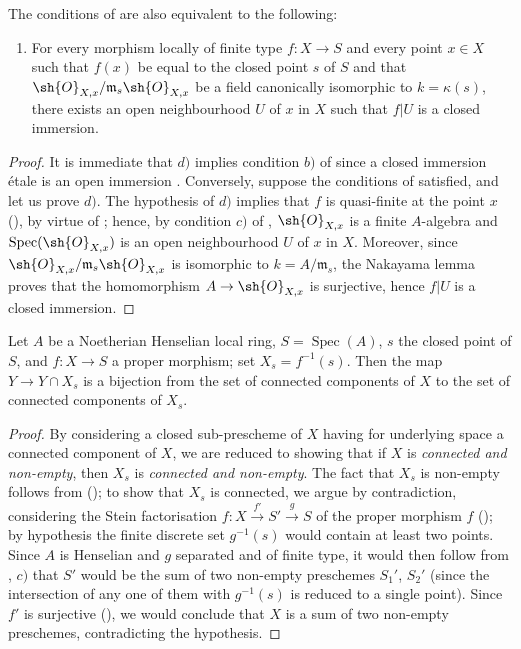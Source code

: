 \begin{remark}[18.5.18]
\label{IV.18.5.18}
The conditions of  are also equivalent to the following:
\begin{enumerate}
  \item[d)] For every morphism locally of finite type $f:X\to S$ and every point $x\in X$ such that $f(x)$ be equal to the closed point $s$ of $S$ and that $\sh{O}_{X,x}/\mathfrak{m}_s\sh{O}_{X,x}$ be a field canonically isomorphic to $k=\kappa(s)$, there exists an open neighbourhood $U$ of $x$ in $X$ such that $f|U$ is a closed immersion.
\end{enumerate}
\end{remark}

\begin{proof}
It is immediate that $d)$ implies condition $b)$ of  since a closed immersion \'etale is an open immersion .
Conversely, suppose the conditions of  satisfied, and let us prove $d)$.
The hypothesis of $d)$ implies that $f$ is quasi-finite at the point $x$ (), by virtue of ;
hence, by condition $c)$ of , $\sh{O}_{X,x}$ is a finite $A$-algebra and $\operatorname{Spec}(\sh{O}_{X,x})$ is an open neighbourhood $U$ of $x$ in $X$.
Moreover, since $\sh{O}_{X,x}/\mathfrak{m}_s\sh{O}_{X,x}$ is isomorphic to $k=A/\mathfrak{m}_s$, the Nakayama lemma proves that the homomorphism $A\to\sh{O}_{X,x}$ is surjective, hence $f|U$ is a closed immersion.
\end{proof}

\begin{proposition}[18.5.19]
\label{IV.18.5.19}
Let $A$ be a Noetherian Henselian local ring, $S=\operatorname{Spec}(A)$, $s$ the closed point of $S$, and $f:X\to S$ a proper morphism;
set $X_s=f^{-1}(s)$.
Then the map $Y\to Y\cap X_s$ is a bijection from the set of connected components of $X$ to the set of connected components of $X_s$.
\end{proposition}

\begin{proof}
By considering a closed sub-prescheme of $X$ having for underlying space a connected component of $X$, we are reduced to showing that if $X$ is \emph{connected and non-empty}, then $X_s$ is \emph{connected and non-empty}.
The fact that $X_s$ is non-empty follows from ();
to show that $X_s$ is connected, we argue by contradiction, considering the Stein factorisation $f:X\xrightarrow{f'}S'\xrightarrow{g}S$ of the proper morphism $f$ ();
by hypothesis the finite discrete set $g^{-1}(s)$ would contain at least two points.
Since $A$ is Henselian and $g$ separated and of finite type, it would then follow from , $c)$ that $S'$ would be the sum of two non-empty preschemes $S_1'$, $S_2'$ (since the intersection of any one of them with $g^{-1}(s)$ is reduced to a single point).
Since $f'$ is surjective (), we would conclude that $X$ is a sum of two non-empty preschemes, contradicting the hypothesis.
\end{proof}
